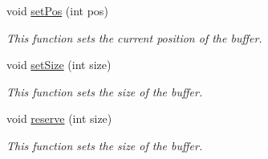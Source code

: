 \begin{CompactItemize}
void \hyperlink{classkmaOrange_1_1JEBuffer_0992fe0c2cab27f8e5055112cdcb163c}{setPos} (int pos)
\begin{CompactList}\small\item\em This function sets the current position of the buffer. \item\end{CompactList}\item 
void \hyperlink{classkmaOrange_1_1JEBuffer_d602533167f2eb6719e70d62c1f9345d}{setSize} (int size)
\begin{CompactList}\small\item\em This function sets the size of the buffer. \item\end{CompactList}\item 
void \hyperlink{classkmaOrange_1_1JEBuffer_481e90a2667cfc2948edab85edea8f39}{reserve} (int size)
\begin{CompactList}\small\item\em This function sets the size of the buffer. \item\end{CompactList}\end{CompactItemize}

